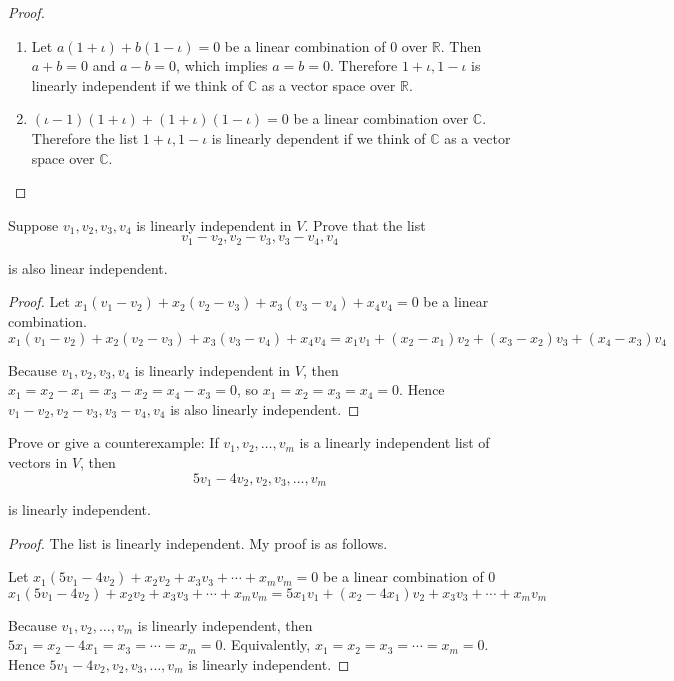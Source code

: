 \begin{proof}
    \begin{enumerate}[label={(\alph*)}]
        \item Let $a(1 + \iota) + b(1 - \iota) = 0$ be a linear combination of $0$ over $\mathbb{R}$. Then $a + b = 0$ and $a - b = 0$, which implies $a = b = 0$. Therefore $1 + \iota, 1 - \iota$ is linearly independent if we think of $\mathbb{C}$ as a vector space over $\mathbb{R}$.
        \item $(\iota - 1)(1 + \iota) + (1 + \iota)(1 - \iota) = 0$ be a linear combination over $\mathbb{C}$. Therefore the list $1 + \iota, 1 - \iota$ is linearly dependent if we think of $\mathbb{C}$ as a vector space over $\mathbb{C}$.
    \end{enumerate}
\end{proof}

\begin{exercise}
    Suppose $v_{1} , v_{2} , v_{3} , v_{4}$ is linearly independent in $V$. Prove that the list
    \[
        v_{1} - v_{2}, v_{2} - v_{3}, v_{3} - v_{4}, v_{4}
    \]

    is also linear independent.
\end{exercise}

\begin{proof}
    Let $x_{1}(v_{1} - v_{2}) + x_{2}(v_{2} - v_{3}) + x_{3}(v_{3} - v_{4}) + x_{4}v_{4} = 0$ be a linear combination.
    \[
        x_{1}(v_{1} - v_{2}) + x_{2}(v_{2} - v_{3}) + x_{3}(v_{3} - v_{4}) + x_{4}v_{4} = x_{1}v_{1} + (x_{2} - x_{1})v_{2} + (x_{3} - x_{2})v_{3} + (x_{4} - x_{3})v_{4}
    \]

    Because $v_{1}, v_{2}, v_{3}, v_{4}$ is linearly independent in $V$, then $x_{1} = x_{2} - x_{1} = x_{3} - x_{2} = x_{4} - x_{3} = 0$, so $x_{1} = x_{2} = x_{3} = x_{4} = 0$. Hence $v_{1} - v_{2}, v_{2} - v_{3}, v_{3} - v_{4}, v_{4}$ is also linearly independent.
\end{proof}

\begin{exercise}
    Prove or give a counterexample: If $v_{1}, v_{2}, \ldots, v_{m}$ is a linearly independent list of vectors in $V$, then
    \[
        5 v_{1} - 4 v_{2}, v_{2}, v_{3}, \ldots, v_{m}
    \]

    is linearly independent.
\end{exercise}

\begin{proof}
    The list is linearly independent. My proof is as follows.

    Let $x_{1}(5v_{1} - 4v_{2}) + x_{2}v_{2} + x_{3}v_{3} + \cdots + x_{m}v_{m} = 0$ be a linear combination of $0$
    \[
        x_{1}(5v_{1} - 4v_{2}) + x_{2}v_{2} + x_{3}v_{3} + \cdots + x_{m}v_{m} = 5x_{1}v_{1} + (x_{2} - 4x_{1})v_{2} + x_{3}v_{3} + \cdots + x_{m}v_{m}
    \]

    Because $v_{1}, v_{2}, \ldots, v_{m}$ is linearly independent, then $5x_{1} = x_{2} - 4x_{1} = x_{3} = \cdots = x_{m} = 0$. Equivalently, $x_{1} = x_{2} = x_{3} = \cdots = x_{m} = 0$. Hence $5v_{1} - 4v_{2}, v_{2}, v_{3}, \ldots, v_{m}$ is linearly independent.
\end{proof}

